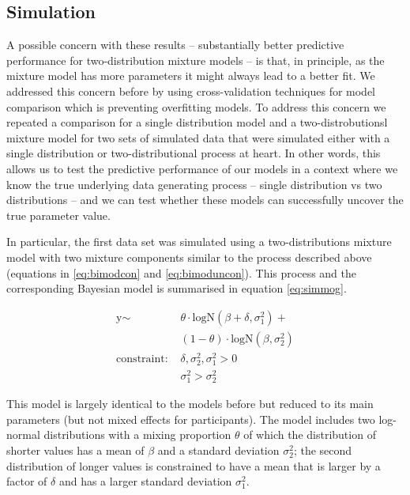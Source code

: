 \documentclass[
  english,
  man,floatsintext]{apa7}
\begin{document}
\clearpage
\makeatletter
\efloat@restorefloats
\makeatother


\begin{appendix}
\section{}
\hypertarget{simulation}{%
\subsection{Simulation}\label{simulation}}

A possible concern with these results -- substantially better predictive
performance for two-distribution mixture models -- is that, in
principle, as the mixture model has more parameters it might always lead
to a better fit. We addressed this concern before by using
cross-validation techniques for model comparison which is preventing
overfitting models. To address this concern we repeated a comparison for
a single distribution model and a two-distrobutionsl mixture model for
two sets of simulated data that were simulated either with a single
distribution or two-distributional process at heart. In other words,
this allows us to test the predictive performance of our models in a
context where we know the true underlying data generating process --
single distribution vs two distributions -- and we can test whether
these models can successfully uncover the true parameter value.

In particular, the first data set was simulated using a
two-distributions mixture model with two mixture components similar to
the process described above (equations in \ref{eq:bimodcon} and
\ref{eq:bimoduncon}). This process and the corresponding Bayesian model
is summarised in equation \ref{eq:simmog}.

\begin{equation}
\begin{aligned}
\label{eq:simmog}
\text{y} \sim\text{ } & \theta \cdot \text{logN}(\beta + \delta, \sigma^2_1) +\\
& (1 - \theta) \cdot \text{logN}(\beta, \sigma^2_2)\\
\text{constraint: } & \delta, \sigma_\text{2}^2, \sigma_\text{1}^2>0\\
        & \sigma_{1}^2 > \sigma_{2}^2
\end{aligned}
\end{equation}

This model is largely identical to the models before but reduced to its
main parameters (but not mixed effects for participants). The model
includes two log-normal distributions with a mixing proportion
\(\theta\) of which the distribution of shorter values has a mean of
\(\beta\) and a standard deviation \(\sigma^2_2\); the second
distribution of longer values is constrained to have a mean that is
larger by a factor of \(\delta\) and has a larger standard deviation
\(\sigma^2_1\).


\end{appendix}
\end{document}
